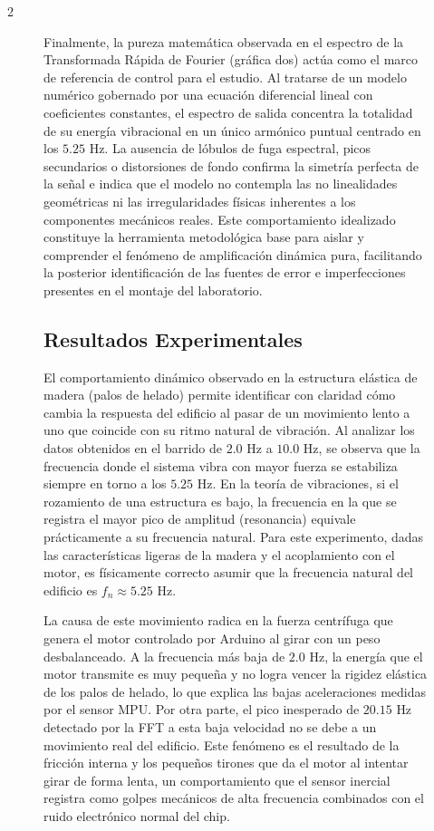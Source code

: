 \documentclass[10pt]{article}
\begin{document}
\begin{multicols}{2}
\begin{figure}[ht]
Finalmente, la pureza matemática observada en el espectro de la Transformada Rápida de Fourier (gráfica dos) actúa como el marco de referencia de control para el estudio. Al tratarse de un modelo numérico gobernado por una ecuación diferencial lineal con coeficientes constantes, el espectro de salida concentra la totalidad de su energía vibracional en un único armónico puntual centrado en los $5.25\text{ Hz}$. La ausencia de lóbulos de fuga espectral, picos secundarios o distorsiones de fondo confirma la simetría perfecta de la señal e indica que el modelo no contempla las no linealidades geométricas ni las irregularidades físicas inherentes a los componentes mecánicos reales. Este comportamiento idealizado constituye la herramienta metodológica base para aislar y comprender el fenómeno de amplificación dinámica pura, facilitando la posterior identificación de las fuentes de error e imperfecciones presentes en el montaje del laboratorio.
\subsection{Resultados Experimentales}

El comportamiento dinámico observado en la estructura elástica de madera (palos de helado) permite identificar con claridad cómo cambia la respuesta del edificio al pasar de un movimiento lento a uno que coincide con su ritmo natural de vibración. Al analizar los datos obtenidos en el barrido de $2.0\text{ Hz}$ a $10.0\text{ Hz}$, se observa que la frecuencia donde el sistema vibra con mayor fuerza se estabiliza siempre en torno a los $5.25\text{ Hz}$. En la teoría de vibraciones, si el rozamiento de una estructura es bajo, la frecuencia en la que se registra el mayor pico de amplitud (resonancia) equivale prácticamente a su frecuencia natural. Para este experimento, dadas las características ligeras de la madera y el acoplamiento con el motor, es físicamente correcto asumir que la frecuencia natural del edificio es $f_n \approx 5.25\text{ Hz}$.

La causa de este movimiento radica en la fuerza centrífuga que genera el motor controlado por Arduino al girar con un peso desbalanceado. A la frecuencia más baja de $2.0\text{ Hz}$, la energía que el motor transmite es muy pequeña y no logra vencer la rigidez elástica de los palos de helado, lo que explica las bajas aceleraciones medidas por el sensor MPU. Por otra parte, el pico inesperado de $20.15\text{ Hz}$ detectado por la FFT a esta baja velocidad no se debe a un movimiento real del edificio. Este fenómeno es el resultado de la fricción interna y los pequeños tirones que da el motor al intentar girar de forma lenta, un comportamiento que el sensor inercial registra como golpes mecánicos de alta frecuencia combinados con el ruido electrónico normal del chip.


\end{figure}
\end{multicols}
\end{document}
